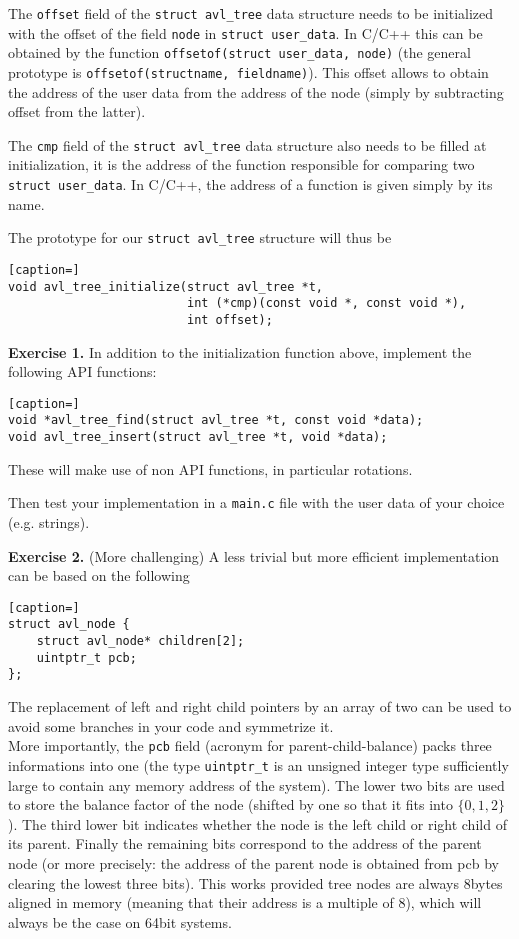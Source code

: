 \documentclass[a4paper,11pt]{article}
\begin{document}
The {\tt offset} field of the {\tt struct avl\_tree} data structure needs to be initialized
with the offset of the field {\tt node} in {\tt struct user\_data}. In C/C++ this can be
obtained by the function {\tt offsetof(struct user\_data, node)} (the general prototype is
{\tt offsetof(structname, fieldname)}). This offset allows to obtain the address of the user
data from the address of the node (simply by subtracting offset from the latter).

The {\tt cmp} field of the {\tt struct avl\_tree} data structure also needs to be filled at 
initialization, it is the address of the function responsible for comparing two {\tt struct user\_data}.
In C/C++, the address of a function is given simply by its name. 

The prototype for our {\tt struct avl\_tree} structure will thus be
\begin{lstlisting}[caption=]
void avl_tree_initialize(struct avl_tree *t, 
                         int (*cmp)(const void *, const void *),
                         int offset);
\end{lstlisting}

\bigskip

{\bf Exercise 1.} In addition to the initialization function above, implement the following API functions:
\begin{lstlisting}[caption=]
void *avl_tree_find(struct avl_tree *t, const void *data);
void avl_tree_insert(struct avl_tree *t, void *data);
\end{lstlisting}
These will make use of non API functions, in particular rotations.

Then test your implementation in a {\tt main.c} file with the user data of your choice (e.g. strings). 

\bigskip

{\bf Exercise 2.} (More challenging)
A less trivial but more efficient implementation can be based on the following
\begin{lstlisting}[caption=]
struct avl_node {
    struct avl_node* children[2];
    uintptr_t pcb;
};
\end{lstlisting}
The replacement of left and right child pointers by an array of two can be used to avoid 
some branches in your code and symmetrize it.\\
More importantly, the {\tt pcb} field (acronym for parent-child-balance) packs three informations 
into one (the type {\tt uintptr\_t} is an unsigned integer type sufficiently large to contain any 
memory address of the system). The lower two bits are used to store the balance factor of the node 
(shifted by one so that it fits into $\{0, 1, 2\}$). The third lower bit
indicates whether the node is the left child or right child of its parent. 
Finally the remaining bits correspond to the address of the parent node (or more precisely: the 
address of the parent node is obtained from pcb by clearing the lowest three bits). This works 
provided tree nodes are always 8bytes aligned in memory (meaning that their address is a 
multiple of 8), which will always be the case on 64bit systems.
\end{document}
